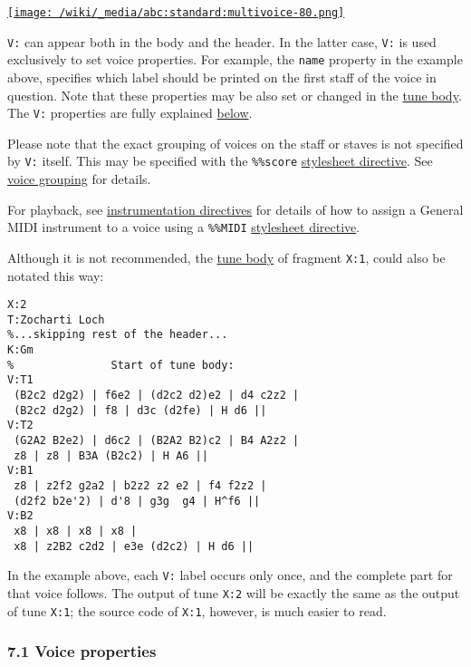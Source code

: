 \href{/wiki/_detail/abc:standard:multivoice-80.png?id=abc\%3Astandard\%3Av2.1}{\texttt{[image: /wiki/\_media/abc:standard:multivoice-80.png]}}

\texttt{V:} can appear both in the body and the header. In the latter
case, \texttt{V:} is used exclusively to set voice properties. For
example, the \texttt{name} property in the example above, specifies
which label should be printed on the first staff of the voice in
question. Note that these properties may be also set or changed in the
\protect\hyperlink{tune_body_definition}{tune body}. The \texttt{V:}
properties are fully explained
\protect\hyperlink{voice_properties}{below}.

Please note that the exact grouping of voices on the staff or staves is
not specified by \texttt{V:} itself. This may be specified with the
\texttt{\%\%score}
\protect\hyperlink{stylesheet_directive_definition}{stylesheet
directive}. See \protect\hyperlink{voice_grouping}{voice grouping} for
details.

For playback, see
\protect\hyperlink{instrumentation_directives}{instrumentation
directives} for details of how to assign a General MIDI instrument to a
voice using a \texttt{\%\%MIDI}
\protect\hyperlink{stylesheet_directive_definition}{stylesheet
directive}.

Although it is not recommended, the
\protect\hyperlink{tune_body_definition}{tune body} of fragment
\texttt{X:1}, could also be notated this way:

\begin{verbatim}
X:2
T:Zocharti Loch
%...skipping rest of the header...
K:Gm
%               Start of tune body:
V:T1
 (B2c2 d2g2) | f6e2 | (d2c2 d2)e2 | d4 c2z2 |
 (B2c2 d2g2) | f8 | d3c (d2fe) | H d6 ||
V:T2
 (G2A2 B2e2) | d6c2 | (B2A2 B2)c2 | B4 A2z2 |
 z8 | z8 | B3A (B2c2) | H A6 ||
V:B1
 z8 | z2f2 g2a2 | b2z2 z2 e2 | f4 f2z2 |
 (d2f2 b2e'2) | d'8 | g3g  g4 | H^f6 ||
V:B2
 x8 | x8 | x8 | x8 |
 x8 | z2B2 c2d2 | e3e (d2c2) | H d6 ||
\end{verbatim}

In the example above, each \texttt{V:} label occurs only once, and the
complete part for that voice follows. The output of tune \texttt{X:2}
will be exactly the same as the output of tune \texttt{X:1}; the source
code of \texttt{X:1}, however, is much easier to read.

\hypertarget{voice_properties}{\subsubsection{7.1 Voice
properties}\label{voice_properties}}

